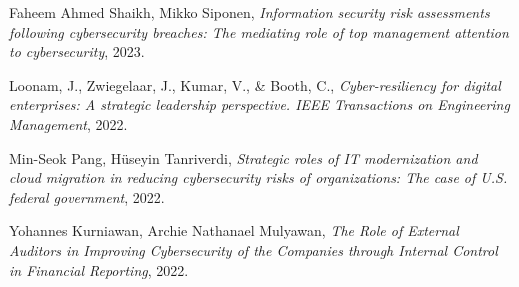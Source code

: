 \documentclass[journal]{IEEEtran}
\begin{document}
\begin{thebibliography}{1}
Faheem Ahmed Shaikh, Mikko Siponen, \emph{Information security risk assessments following cybersecurity breaches: The mediating role of top management attention to cybersecurity}, 2023.

Loonam, J., Zwiegelaar, J., Kumar, V., & Booth, C., \emph{Cyber-resiliency for digital enterprises: A strategic leadership perspective. IEEE Transactions on Engineering Management}, 2022.

Min-Seok Pang, Hüseyin Tanriverdi, \emph{Strategic roles of IT modernization and cloud migration in reducing cybersecurity risks of organizations: The case of U.S. federal government}, 2022.

Yohannes Kurniawan, Archie Nathanael Mulyawan, \emph{The Role of External Auditors in Improving Cybersecurity of the Companies through Internal Control in Financial Reporting}, 2022.
\end{thebibliography}

% 








\end{document}
